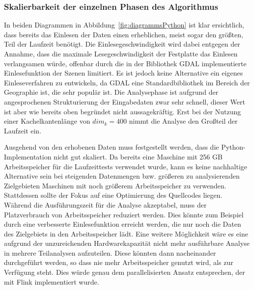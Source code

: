 \subsubsection{Skalierbarkeit der einzelnen Phasen des Algorithmus}
In beiden Diagrammen in Abbildung~\ref{fig:diagrammsPython} ist klar ersichtlich, dass bereits das Einlesen der Daten einen erheblichen, meist sogar den größten, Teil der Laufzeit benötigt. Die Einlesegeschwindigkeit wird dabei entgegen der Annahme, dass die maximale Lesegeschwindigkeit der Festplatte das Einlesen verlangsamen würde, offenbar durch die in der Bibliothek GDAL implementierte Einlesefunktion der Szenen limitiert. Es ist jedoch keine Alternative ein eigenes Einleseverfahren zu entwickeln, da GDAL eine Standardbibliothek im Bereich der Geographie ist, die sehr populär ist. Die Analysephase ist aufgrund der angesprochenen Strukturierung der Eingabedaten zwar sehr schnell, dieser Wert ist aber wie bereits oben begründet nicht aussagekräftig. Erst bei der Nutzung einer Kachelkantenlänge von $dim_k = 400$ nimmt die Analyse den Großteil der Laufzeit ein.

Ausgehend von den erhobenen Daten muss festgestellt werden, dass die Python-Implementation nicht gut skaliert. Da bereits eine Maschine mit 256 GB Arbeitsspeicher für die Laufzeittests verwendet wurde, kann es keine nachhaltige Alternative sein bei steigenden Datenmengen bzw. größeren zu analysierenden Zielgebieten Maschinen mit noch größerem Arbeitsspeicher zu verwenden. Stattdessen sollte der Fokus auf eine Optimierung des Quellcodes liegen. Während die Ausführungszeit für die Analyse akzeptabel, muss der Platzverbrauch von Arbeitsspeicher reduziert werden. Dies könnte zum Beispiel durch eine verbesserte Einlesefunktion erreicht werden, die nur noch die Daten des Zielgebiets in den Arbeitsspeicher lädt. Eine weitere Möglichkeit wäre es eine aufgrund der unzureichenden Hardwarekapazität nicht mehr ausführbare Analyse in mehrere Teilanalysen aufzuteilen. Diese könnten dann nacheinander durchgeführt werden, so dass nie mehr Arbeitsspeicher genutzt wird, als zur Verfügung steht. Dies würde genau dem parallelisierten Ansatz entsprechen, der mit Flink implementiert wurde.

